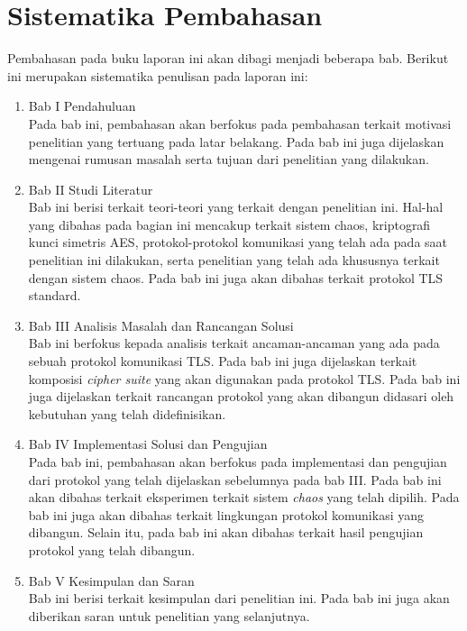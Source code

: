 \section{Sistematika Pembahasan}
Pembahasan pada buku laporan ini akan dibagi menjadi beberapa bab. Berikut ini merupakan sistematika penulisan pada laporan ini:

\begin{enumerate}
  \item Bab I Pendahuluan\\
  Pada bab ini, pembahasan akan berfokus pada pembahasan terkait motivasi penelitian yang tertuang pada latar belakang. Pada bab ini juga dijelaskan mengenai rumusan masalah serta tujuan dari penelitian yang dilakukan.

  \item Bab II Studi Literatur\\
  Bab ini berisi terkait teori-teori yang terkait dengan penelitian ini. Hal-hal yang dibahas pada bagian ini mencakup terkait sistem chaos, kriptografi kunci simetris AES, protokol-protokol komunikasi yang telah ada pada saat penelitian ini dilakukan, serta penelitian yang telah ada khususnya terkait dengan sistem chaos. Pada bab ini juga akan dibahas terkait protokol TLS standard.

  \item Bab III Analisis Masalah dan Rancangan Solusi\\
  Bab ini berfokus kepada analisis terkait ancaman-ancaman yang ada pada sebuah protokol komunikasi TLS. Pada bab ini juga dijelaskan terkait komposisi \emph{cipher suite} yang akan digunakan pada protokol TLS. Pada bab ini juga dijelaskan terkait rancangan protokol yang akan dibangun didasari oleh kebutuhan yang telah didefinisikan.

  \item Bab IV Implementasi Solusi dan Pengujian\\
  Pada bab ini, pembahasan akan berfokus pada implementasi dan pengujian dari protokol yang telah dijelaskan sebelumnya pada bab III. Pada bab ini akan dibahas terkait eksperimen terkait sistem \emph{chaos} yang telah dipilih. Pada bab ini juga akan dibahas terkait lingkungan protokol komunikasi yang dibangun. Selain itu, pada bab ini akan dibahas terkait hasil pengujian protokol yang telah dibangun.

  \item Bab V Kesimpulan dan Saran\\
  Bab ini berisi terkait kesimpulan dari penelitian ini. Pada bab ini juga akan diberikan saran untuk penelitian yang selanjutnya.
\end{enumerate}
